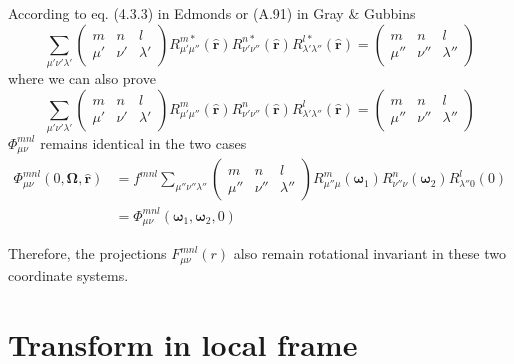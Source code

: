 According to eq. (4.3.3) in Edmonds \citep{Edmonds} or (A.91) in
Gray \& Gubbins \citep{Gray-Gubbins}
\begin{equation}
\sum_{\mu'\nu'\lambda'}\left(\begin{array}{ccc}
m & n & l\\
\mu' & \nu' & \lambda'
\end{array}\right)R_{\mu'\mu''}^{m*}(\mathbf{\hat{r}})R_{\nu'\nu''}^{n*}(\mathbf{\hat{r}})R_{\lambda'\lambda''}^{l*}(\mathbf{\hat{r}})=\left(\begin{array}{ccc}
m & n & l\\
\mu'' & \nu'' & \lambda''
\end{array}\right)
\end{equation}
where we can also prove
\begin{equation}
\sum_{\mu'\nu'\lambda'}\left(\begin{array}{ccc}
m & n & l\\
\mu' & \nu' & \lambda'
\end{array}\right)R_{\mu'\mu''}^{m}(\mathbf{\hat{r}})R_{\nu'\nu''}^{n}(\mathbf{\hat{r}})R_{\lambda'\lambda''}^{l}(\mathbf{\hat{r}})=\left(\begin{array}{ccc}
m & n & l\\
\mu'' & \nu'' & \lambda''
\end{array}\right)
\end{equation}
$\Phi_{\mu\nu}^{mnl}$ remains identical in the two cases
\begin{align}
\Phi_{\mu\nu}^{mnl}(0,\mathbf{\Omega},\mathbf{\hat{r}}) & =f^{mnl}\sum_{\mu''\nu''\lambda''}\left(\begin{array}{ccc}
m & n & l\\
\mu'' & \nu'' & \lambda''
\end{array}\right)R_{\mu''\mu}^{m}(\boldsymbol{\omega}_{1})R_{\nu''\nu}^{n}(\boldsymbol{\omega}_{2})R_{\lambda''0}^{l}(0)\nonumber \\
 & =\Phi_{\mu\nu}^{mnl}(\boldsymbol{\omega}_{1},\boldsymbol{\omega}_{2},0)
\end{align}

Therefore, the projections $F_{\mu\nu}^{mnl}(r)$ also remain rotational
invariant in these two coordinate systems.

\section{Transform in local frame}

